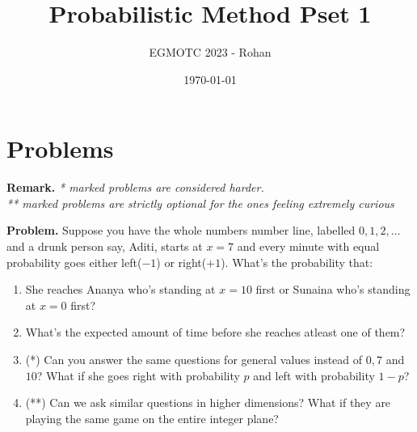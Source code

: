 \documentclass[12pt]{article}
\title{Probabilistic Method Pset 1}
\author{EGMOTC 2023 - Rohan}
\date{\today}
\begin{document}
\maketitle

\newcommand{\localtextbulletone}{\textcolor{black}{\raisebox{.45ex}{\rule{.6ex}{.6ex}}}}
\renewcommand{\labelitemi}{\localtextbulletone}

\section*{Problems}
\vspace{1cm}
\thispagestyle{empty}

\textbf{Remark.} \textit{* marked problems are considered harder.\\ ** marked problems are strictly optional for the ones feeling extremely curious\\}


\textbf{Problem.} Suppose you have the whole numbers number line, labelled $0,1,2,\ldots$ and a drunk person say, Aditi, starts at $x=7$ and every minute with equal probability goes either left($-1$) or right($+1$). What's the probability that:
    \begin{enumerate}
        \item She reaches Ananya who's standing at $x=10$ first or Sunaina who's standing at $x=0$ first?
        \item What's the expected amount of time before she reaches atleast one of them?
        \item (*) Can you answer the same questions for general values instead of $0,7$ and $10$? What if she goes right with probability $p$ and left with probability $1-p$?
        \item (**) Can we ask similar questions in higher dimensions? What if they are playing the same game on the entire integer plane?
    \end{enumerate}
\end{document}
